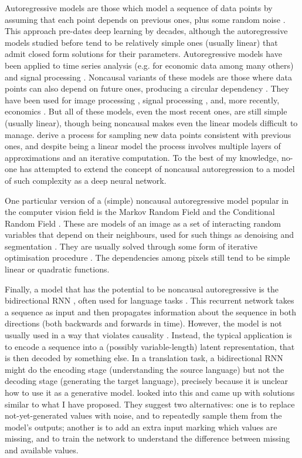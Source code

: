 \documentclass[10pt,a4paper]{article}
\begin{document}
Autoregressive models are those which model a sequence of data points by assuming that each point depends on previous ones, plus some random noise \citep{autoregressive1}. This approach pre-dates deep learning by decades, although the autoregressive models studied before tend to be relatively simple ones (usually linear) that admit closed form solutions for their parameters. Autoregressive models have been applied to time series analysis (e.g. for economic data among many others) and signal processing \citep{timeseries}. Noncausal variants of these models are those where data points can also depend on future ones, producing a circular dependency \citep{noncausallikelihood}. They have been used for image processing \citep{noncausalimage1,noncausalimage2}, signal processing \citep{noncausalsignal}, and, more recently, economics \citep{noncausaleco1,noncausaleco2}. But all of these models, even the most recent ones, are still simple (usually linear), though being noncausal makes even the linear models difficult to manage. \citet{noncausaleco2} derive a process for sampling new data points consistent with previous ones, and despite being a linear model the process involves multiple layers of approximations and an iterative computation. To the best of my knowledge, no-one has attempted to extend the concept of noncausal autoregression to a model of such complexity as a deep neural network.

One particular version of a (simple) noncausal autoregressive model popular in the computer vision field is the Markov Random Field \citep{mrf1,mrf2} and the Conditional Random Field \citep{crf1,crf2}. These are models of an image as a set of interacting random variables that depend on their neighbours, used for such things as denoising and segmentation \citep{mrfuse1,mrfuse2}. They are usually solved through some form of iterative optimisation procedure \citep{mrflearning1,mrflearning2}. The dependencies among pixels still tend to be simple linear or quadratic functions.

Finally, a model that has the potential to be noncausal autoregressive is the bidirectional RNN \citep{brnn1,brnn2}, often used for language tasks \citep{brnnuse1,brnnuse2,brnnuse3}. This recurrent network takes a sequence as input and then propagates information about the sequence in both directions (both backwards and forwards in time). However, the model is not usually used in a way that violates causality \citep{brnndenoise}. Instead, the typical application is to encode a sequence into a (possibly variable-length) latent representation, that is then decoded by something else. In a translation task, a bidirectional RNN might do the encoding stage (understanding the source language) but not the decoding stage (generating the target language), precisely because it is unclear how to use it as a generative model. \citet{brnndenoise} looked into this and came up with solutions similar to what I have proposed. They suggest two alternatives: one is to replace not-yet-generated values with noise, and to repeatedly sample them from the model's outputs; another is to add an extra input marking which values are missing, and to train the network to understand the difference between missing and available values.
\end{document}
